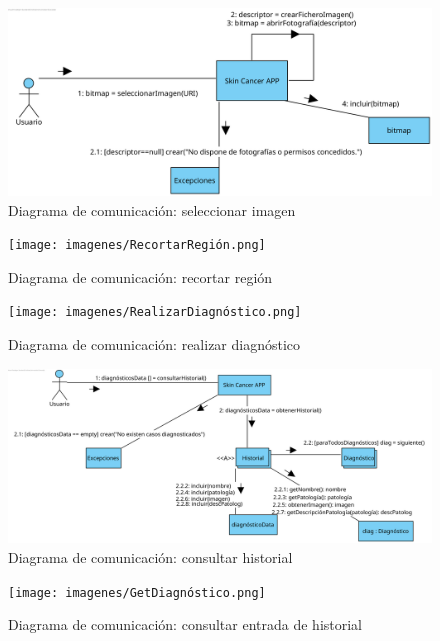  
\begin{figure}[H]
 	\centering
 	\includegraphics[scale = 0.8]{imagenes/SeleccionarImagen.png}
 	\caption{Diagrama de comunicación: seleccionar imagen}
 	\label{fig:com2}
 \end{figure}
 
\begin{figure}[H]
 	\centering
 	\texttt{[image: imagenes/RecortarRegión.png]}
 	\caption{Diagrama de comunicación: recortar región}
 	\label{fig:com3}
 \end{figure}
 
 \begin{figure}[H]
 	\centering
 	\texttt{[image: imagenes/RealizarDiagnóstico.png]}
 	\caption{Diagrama de comunicación: realizar diagnóstico}
 	\label{fig:com4}
 \end{figure}
 
  \begin{figure}[H]
 	\centering
 	\includegraphics[scale = 0.75]{imagenes/HistorialSec.png}
 	\caption{Diagrama de comunicación: consultar historial}
 	\label{fig:com5}
 \end{figure}
 
 
   \begin{figure}[H]
 	\centering
 	\texttt{[image: imagenes/GetDiagnóstico.png]}
 	\caption{Diagrama de comunicación: consultar entrada de historial}
 	\label{fig:com6}
 \end{figure}
 
